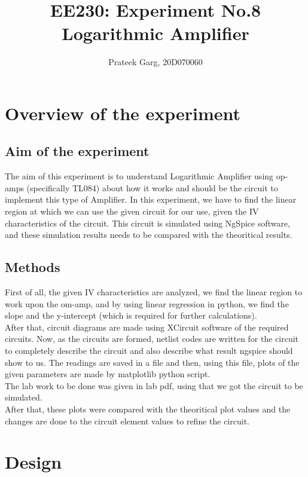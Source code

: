 \documentclass[12pt]{article}
\title{EE230: Experiment No.8\\
Logarithmic Amplifier}
\author{Prateek Garg, 20D070060}
\begin{document}
\maketitle
 

\section{Overview of the experiment} %

\subsection{Aim of the experiment}%

The aim of this experiment is to understand Logarithmic Amplifier using op-amps (specifically TL084) about how it works and should be the circuit to implement this type of Amplifier. In this experiment, we have to find the linear region at which we can use the given circuit for our use, given the IV characteristics of the circuit. This circuit is simulated using NgSpice software, and these simulation results needs to be compared with the theoritical results.

\subsection{Methods}
First of all, the given IV characteristics are analyzed, we find the linear region to work upon the om-amp, and by using linear regression in python, we find the slope and the y-intercept (which is required for further calculations).\\
After that, circuit diagrams are made using XCircuit software of the required circuits. Now, as the circuits are formed, netlist codes are written for the circuit to completely describe the circuit and also describe what result ngspice should show to us. The readings are saved in a file and then, using this file, plots of the given parameters are made by matplotlib python script.\\
The lab work to be done was given in lab pdf, using that we got the circuit to be simulated.\\
After that, these plots were compared with the theoritical plot values and the changes are done to the circuit element values to refine the circuit.

\section{Design}%
\end{document}
